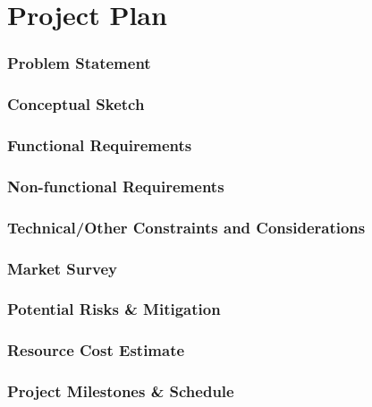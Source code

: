 \section{Project Plan}

\begin{frame}
\frametitle{Problem Statement}


\end{frame}

\begin{frame}
\frametitle{Conceptual Sketch}


\end{frame}

\begin{frame}
\frametitle{Functional Requirements}


\end{frame}

\begin{frame}
\frametitle{Non-functional Requirements}


\end{frame}

\begin{frame}
\frametitle{Technical/Other Constraints and Considerations}


\end{frame}

\begin{frame}
\frametitle{Market Survey}


\end{frame}

\begin{frame}
\frametitle{Potential Risks \& Mitigation}


\end{frame}

\begin{frame}
\frametitle{Resource Cost Estimate}


\end{frame}

\begin{frame}
\frametitle{Project Milestones \& Schedule}


\end{frame}
